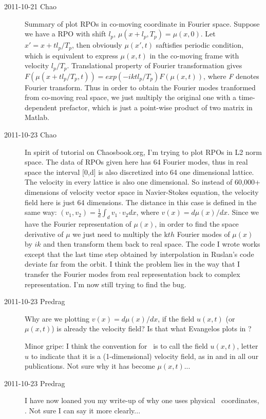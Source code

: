 \begin{description}
\item[2011-10-21 Chao] Summary of plot RPOs in co-moving coordinate in Fourier space.
Suppose we have a RPO with shift $\textit{$l_p$}$, $\mu(x+\textit{$l_p$},\textit{$T_p$})=\mu(x,0)$. Let $x'=x+t\textit{$l_p$}/\textit{$T_p$}$, then obviously $\mu(x',t)$ saftisfies periodic condition, which is equivalent to express $\mu(x,t)$ in the co-moving frame with velocity $\textit{$l_p$}/\textit{$T_p$}$.  Translational property of Fourier transformation gives $\textit{F}(\mu(x+t\textit{$l_p$}/\textit{$T_p$},\textit{t})) = exp(-ikt\textit{$l_p$}/\textit{$T_p$})\textit{F}(\mu(x,t))$, where \textit{F} denotes Fourier transform. Thus in order to obtain the Fourier modes tranformed from co-moving real space, we just multiply the original one with a time-dependent prefactor, which is just a point-wise product of two matrix in Matlab.

\item[2011-10-23 Chao] In spirit of tutorial on Chaosbook.org, I'm trying
to plot RPOs in L2 norm space. The data of RPOs given here has 64 Fourier
modes, thus in real space the interval [0,d] is also discretized into 64
one dimensional lattice. The velocity in every lattice is also one
dimensional. So instead of 60,000+ dimensions of velocity vector space in
Navier-Stokes equation, the velocity field here is just 64 dimensions.
The distance in this case is defined in the same way: $(v_1,v_2) =
\frac{1}{d}\int_d{v_1}\cdot{v_2}dx$, where $v(x)=d\mu(x)/dx$. Since we
have the Fourier representation of $\mu(x)$, in order to find the space
derivative of $\mu$ we just need to multiply the k$th$ Fourier modes of
$\mu(x)$ by $ik$ and then transform them back to real space. The code I
wrote works except that the last time step obtained by interpolation in
Ruslan's code deviate far from the orbit. I think the problem lies in the
way that I transfer the Fourier modes from real representation back to
complex representation. I'm now still trying to find the bug.

\item[2011-10-23 Predrag]
Why are we plotting $v(x)=d\mu(x)/dx$,
if the field $u(x,t)$ (or $\mu(x,t)$) is already the velocity field?
Is that what Evangelos plots in ?

Minor gripe: I think the convention for \KSe\ is to call the
field $u(x,t)$, letter $u$ to indicate that it is a (1-dimensional)
velocity field, as in  and in all our publications. Not
sure why it has become $\mu(x,t)$...

\item[2011-10-23 Predrag]
I have now loaned you my write-up of why one uses physical \statesp\
coordinates, . Not sure I can say it more
clearly...


\end{description}
